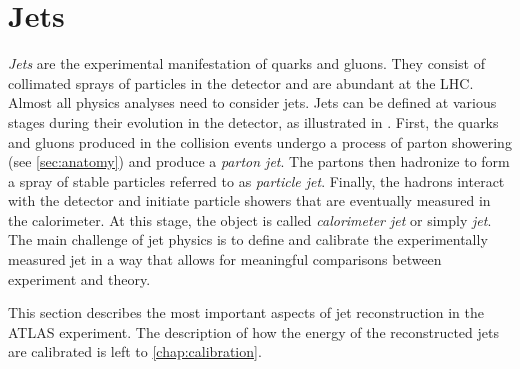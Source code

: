 \section{Jets}
\emph{Jets} are the experimental manifestation of quarks and gluons.
They consist of collimated sprays of particles in the detector and are abundant at the LHC.
Almost all physics analyses need to consider jets. Jets can be defined at various stages during their evolution in the detector, as illustrated in . First, the quarks and gluons produced in the collision events undergo a process of parton showering (see \cref{sec:anatomy}) and produce a \emph{parton jet}. The partons then hadronize to form a spray of stable particles referred to as \emph{particle jet}. Finally, the hadrons interact with the detector and initiate particle showers that are eventually measured in the calorimeter. At this stage, the object is called \emph{calorimeter jet} or simply \emph{jet}.
The main challenge of jet physics is to define and calibrate the experimentally measured jet in a way that allows for meaningful comparisons between experiment and theory. 

This section describes the most important aspects of jet reconstruction in the ATLAS experiment.
The description of how the energy of the reconstructed jets are calibrated is left to \cref{chap:calibration}.

